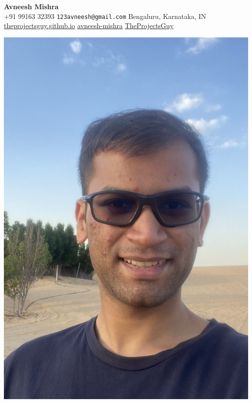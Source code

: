 



    {
    \hfill
    \begin{minipage}{0.85\textwidth}
        \begin{center}
            {\bf \LARGE Avneesh Mishra} 
            \\ [4mm] \hfill                 %
            \phoneChar +91 99163 32393 
            \hfill                          %
            \texttt{123avneesh@gmail.com} 
            \hfill                          %
            \homeChar Bengaluru, Karnataka, IN 
            \hfill { } \\ [1mm] \hfill      %
            \webChar \href{https://theprojectsguy.github.io/}{
                theprojectsguy.github.io} 
            \hfill                          %
            \linkedinChar \href{
                https://www.linkedin.com/in/avneesh-mishra/}{
                avneesh-mishra}
            \hfill                          %
            \githubChar \href{https://github.com/TheProjectsGuy}{
                TheProjectsGuy}
            \hfill { } \\
        \end{center}
    \end{minipage}
    \begin{minipage}{0.1\textwidth}
        \includegraphics[width=\linewidth]{me.jpg}
    \end{minipage} \\
    }
